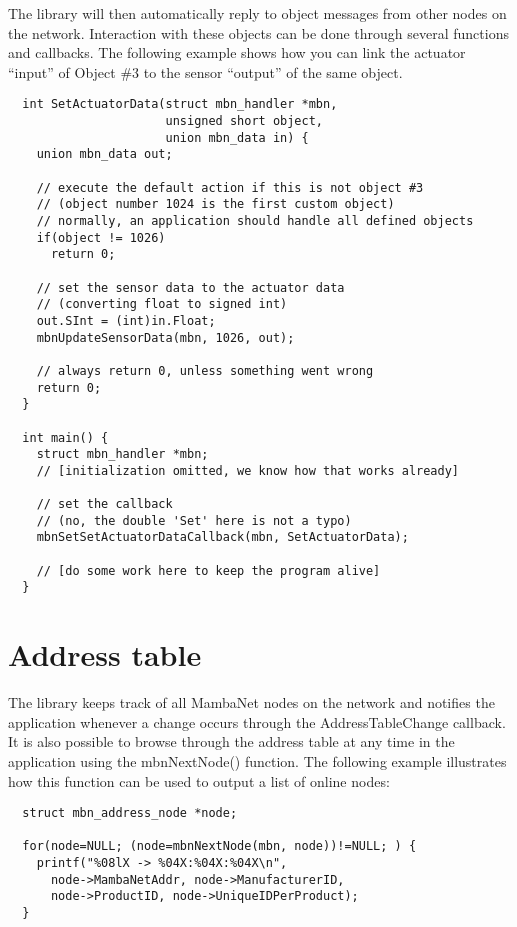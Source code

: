 The library will then automatically reply to object messages from other nodes on the network. Interaction with these objects can be done through several functions and callbacks. The following example shows how you can link the actuator ``input'' of Object \#3 to the sensor ``output'' of the same object.
\begin{verbatim}
  int SetActuatorData(struct mbn_handler *mbn,
                      unsigned short object,
                      union mbn_data in) {
    union mbn_data out;

    // execute the default action if this is not object #3
    // (object number 1024 is the first custom object)
    // normally, an application should handle all defined objects
    if(object != 1026)
      return 0;

    // set the sensor data to the actuator data
    // (converting float to signed int)
    out.SInt = (int)in.Float;
    mbnUpdateSensorData(mbn, 1026, out);

    // always return 0, unless something went wrong
    return 0;
  }

  int main() {
    struct mbn_handler *mbn;
    // [initialization omitted, we know how that works already]

    // set the callback
    // (no, the double 'Set' here is not a typo)
    mbnSetSetActuatorDataCallback(mbn, SetActuatorData);

    // [do some work here to keep the program alive]
  }
\end{verbatim}



\section{Address table}
The library keeps track of all MambaNet nodes on the network and notifies the application whenever a change occurs through the AddressTableChange callback. It is also possible to browse through the address table at any time in the application using the mbnNextNode() function. The following example illustrates how this function can be used to output a list of online nodes:
\begin{verbatim}
  struct mbn_address_node *node;

  for(node=NULL; (node=mbnNextNode(mbn, node))!=NULL; ) {
    printf("%08lX -> %04X:%04X:%04X\n",
      node->MambaNetAddr, node->ManufacturerID,
      node->ProductID, node->UniqueIDPerProduct);
  }
\end{verbatim}

